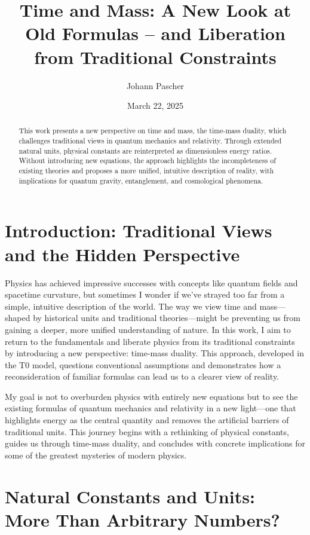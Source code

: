 \documentclass[a4paper,12pt]{article}
\title{Time and Mass: A New Look at Old Formulas – and Liberation from Traditional Constraints}
\author{Johann Pascher}
\date{March 22, 2025}
\begin{document}
	
	\maketitle
	
	\begin{abstract}
		This work presents a new perspective on time and mass, the time-mass duality, which challenges traditional views in quantum mechanics and relativity. Through extended natural units, physical constants are reinterpreted as dimensionless energy ratios. Without introducing new equations, the approach highlights the incompleteness of existing theories and proposes a more unified, intuitive description of reality, with implications for quantum gravity, entanglement, and cosmological phenomena.
	\end{abstract}
	
	\tableofcontents
	\newpage
	
	\section{Introduction: Traditional Views and the Hidden Perspective}
	
	Physics has achieved impressive successes with concepts like quantum fields and spacetime curvature, but sometimes I wonder if we've strayed too far from a simple, intuitive description of the world. The way we view time and mass—shaped by historical units and traditional theories—might be preventing us from gaining a deeper, more unified understanding of nature. In this work, I aim to return to the fundamentals and liberate physics from its traditional constraints by introducing a new perspective: time-mass duality. This approach, developed in the T0 model, questions conventional assumptions and demonstrates how a reconsideration of familiar formulas can lead us to a clearer view of reality.
	
	My goal is not to overburden physics with entirely new equations but to see the existing formulas of quantum mechanics and relativity in a new light—one that highlights energy as the central quantity and removes the artificial barriers of traditional units. This journey begins with a rethinking of physical constants, guides us through time-mass duality, and concludes with concrete implications for some of the greatest mysteries of modern physics.
	
	\section{Natural Constants and Units: More Than Arbitrary Numbers?}
	
\end{document}
